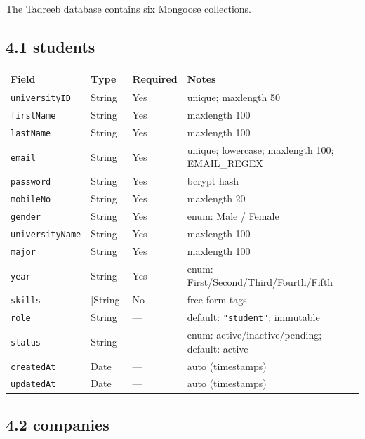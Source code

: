 \documentclass[12pt,a4paper]{article}
\begin{document}
The Tadreeb database contains six Mongoose collections.

\vspace{0.5cm}

\subsection*{4.1 students}

\begin{longtable}{p{3.5cm}p{2.5cm}p{1.8cm}p{5.5cm}}
  \toprule
  \textbf{Field} & \textbf{Type} & \textbf{Required} & \textbf{Notes} \\
  \midrule
  \texttt{universityID} & String & Yes & unique; maxlength 50 \\
  \texttt{firstName}    & String & Yes & maxlength 100 \\
  \texttt{lastName}     & String & Yes & maxlength 100 \\
  \texttt{email}        & String & Yes & unique; lowercase; maxlength 100; EMAIL\_REGEX \\
  \texttt{password}     & String & Yes & bcrypt hash \\
  \texttt{mobileNo}     & String & Yes & maxlength 20 \\
  \texttt{gender}       & String & Yes & enum: Male / Female \\
  \texttt{universityName} & String & Yes & maxlength 100 \\
  \texttt{major}        & String & Yes & maxlength 100 \\
  \texttt{year}         & String & Yes & enum: First/Second/Third/Fourth/Fifth \\
  \texttt{skills}       & [String] & No & free-form tags \\
  \texttt{role}         & String & — & default: \texttt{"student"}; immutable \\
  \texttt{status}       & String & — & enum: active/inactive/pending; default: active \\
  \texttt{createdAt}    & Date   & — & auto (timestamps) \\
  \texttt{updatedAt}    & Date   & — & auto (timestamps) \\
  \bottomrule
\end{longtable}

\subsection*{4.2 companies}
\end{document}
